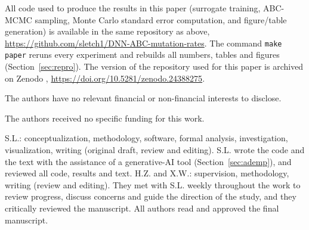 \documentclass[sn-basic,iicol,pdflatex]{sn-jnl}
\begin{document}
All code used to produce the results in this paper (surrogate training,
ABC-MCMC sampling, Monte Carlo standard error computation, and figure/table
generation) is available in the same repository as above,
\url{https://github.com/sletch1/DNN-ABC-mutation-rates}. The command \texttt{make paper} reruns every
experiment and rebuilds all numbers, tables and figures (Section~\ref{sec:repro}). The version of the repository used for this paper is archived on Zenodo \citep{letchumanan2026code}, \url{https://doi.org/10.5281/zenodo.24388275}.

The authors have no relevant financial or non-financial interests to disclose.

The authors received no specific funding for this work.

S.L.: conceptualization, methodology, software, formal analysis, investigation, visualization, writing (original draft, review and editing). S.L. wrote the code and the text with the assistance of a generative-AI tool (Section~\ref{sec:ademp}), and reviewed all code, results and text. H.Z. and X.W.: supervision, methodology, writing (review and editing). They met with S.L. weekly throughout the work to review progress, discuss concerns and guide the direction of the study, and they critically reviewed the manuscript. All authors read and approved the final manuscript.


\end{document}
